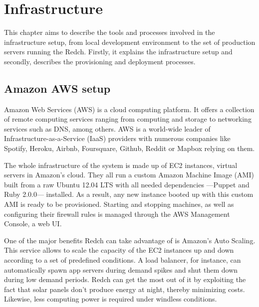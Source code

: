 \chapter{Infrastructure}

This chapter aims to describe the tools and processes involved in the infrastructure setup, from local development environment to the set of production servers running the Redch. Firstly, it explains the infrastructure setup and secondly, describes the provisioning and deployment processes.

\section{Amazon AWS setup}

Amazon Web Services (AWS) is a cloud computing platform. It offers a collection of remote computing services ranging from computing and storage to networking services such as DNS, among others. AWS is a world-wide leader of Infrastructure-as-a-Service (IaaS) providers with numerous companies like Spotify, Heroku, Airbnb, Foursquare, Github, Reddit or Mapbox relying on them.

The whole infrastructure of the system is made up of EC2 instances, virtual servers in Amazon's cloud. They all run a custom Amazon Machine Image (AMI) built from a raw Ubuntu 12.04 LTS with all needed dependencies ---Puppet and Ruby 2.0.0--- installed. As a result, any new instance booted up with this custom AMI is ready to be provisioned. Starting and stopping machines, as well as configuring their firewall rules is managed through the AWS Management Console, a web UI.

One of the major benefits Redch can take advantage of is Amazon's Auto Scaling. This service allows to scale the capacity of the EC2 instances up and down according to a set of predefined conditions. A load balancer, for instance, can automatically spawn app servers during demand spikes and shut them down during low demand periods. Redch can get the most out of it by exploiting the fact that solar panels don't produce energy at night, thereby minimizing costs. Likewise, less computing power is required under windless conditions.

